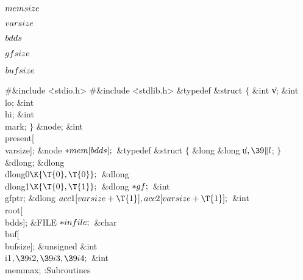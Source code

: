 \Y\B\4\D$\\{memsize}$ \5
\par
\B\4\D$\\{varsize}$ \5
\par
\B\4\D$\\{bdds}$ \5
\par
\B\4\D$\\{gfsize}$ \5
\par
\B\4\D$\\{bufsize}$ \5
\par
\Y\B\8\#\&{include} \.{<stdio.h>}\6
\8\#\&{include} \.{<stdlib.h>}\6
\&{typedef} \&{struct} ${}\{{}$\1\6
\&{int} \|v;\6
\&{int} \\{lo};\6
\&{int} \\{hi};\6
\&{int} \\{mark};\2\6
${}\}{}$ \&{node};\6
\&{int} \\{present}[\\{varsize}];\6
\&{node} ${}{*}\\{mem}[\\{bdds}];{}$\6
\&{typedef} \&{struct} ${}\{{}$\1\6
\&{long} \&{long} \|u${},\39\|l{}$;\2\6
${}\}{}$ \&{dlong};\6
\&{dlong} \\{dlong0}${}\K\{\T{0},\39\T{0}\};{}$\6
\&{dlong} \\{dlong1}${}\K\{\T{0},\39\T{1}\};{}$\6
\&{dlong} ${}{*}\\{gf};{}$\6
\&{int} \\{gfptr};\6
\&{dlong} ${}\\{acc1}[\\{varsize}+\T{1}],\39\\{acc2}[\\{varsize}+\T{1}];{}$\6
\&{int} \\{root}[\\{bdds}];\6
\&{FILE} ${}{*}\\{infile};{}$\6
\&{char} \\{buf}[\\{bufsize}];\6
\&{unsigned} \&{int} \\{i1}${},\39\\{i2},\39\\{i3},\39\\{i4};{}$\6
\&{int} \\{memmax};\7
\*:Subroutines\X\7
